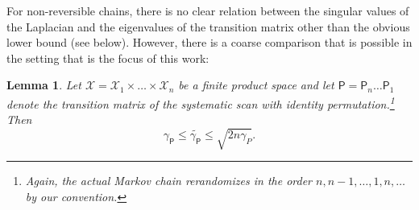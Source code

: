 \documentclass[11pt]{article}
\newtheorem{lemma}{Lemma}[section]
\begin{document}
For non-reversible chains, there is no clear relation between the singular values of the Laplacian and the eigenvalues of the transition matrix other than the obvious lower bound (see below). However, there is a coarse comparison that is possible in the setting that is the focus of this work:
\begin{lemma}
\label{lem:gibbs_comp}
    Let $\mathcal{X}=\mathcal{X}_1\times\ldots\times \mathcal{X}_n$ be a finite product space and let $\mathsf{P}=\mathsf{P}_n\ldots \mathsf{P}_1$ denote the transition matrix of the systematic scan with identity permutation.\footnote{Again, the actual Markov chain rerandomizes in the order $n,n-1,\ldots,1,n,\ldots$ by our convention.} Then
    \begin{equation*}
        \gamma_{\mathsf{P}}\leq \widetilde{\gamma_{\mathsf{P}}}\leq \sqrt{2n\gamma_{P}}.
    \end{equation*}
\end{lemma}
\end{document}
